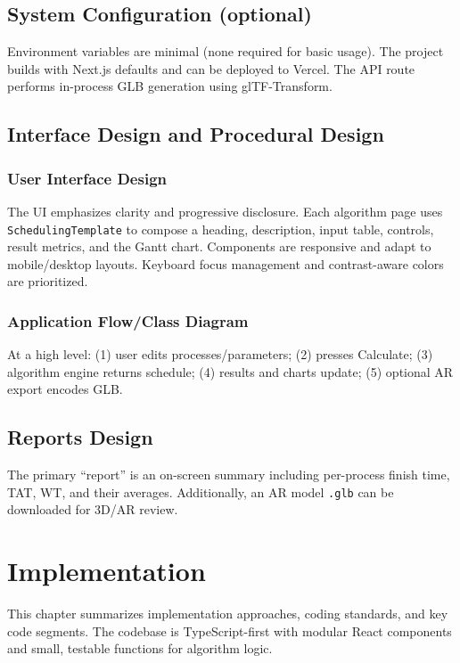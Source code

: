 \documentclass[12pt,a4paper,oneside]{report}
\begin{document}
\section{System Configuration (optional)}
Environment variables are minimal (none required for basic usage). The project builds with Next.js defaults and can be deployed to Vercel. The API route performs in-process GLB generation using glTF-Transform.

\section{Interface Design and Procedural Design}
\subsection{User Interface Design}
The UI emphasizes clarity and progressive disclosure. Each algorithm page uses \verb|SchedulingTemplate| to compose a heading, description, input table, controls, result metrics, and the Gantt chart. Components are responsive and adapt to mobile/desktop layouts. Keyboard focus management and contrast-aware colors are prioritized.

\subsection{Application Flow/Class Diagram}
At a high level: (1) user edits processes/parameters; (2) presses Calculate; (3) algorithm engine returns schedule; (4) results and charts update; (5) optional AR export encodes GLB.

\section{Reports Design}
The primary “report” is an on-screen summary including per-process finish time, TAT, WT, and their averages. Additionally, an AR model \texttt{.glb} can be downloaded for 3D/AR review.

\chapter{Implementation}
\noindent This chapter summarizes implementation approaches, coding standards, and key code segments. The codebase is TypeScript-first with modular React components and small, testable functions for algorithm logic.
\end{document}

